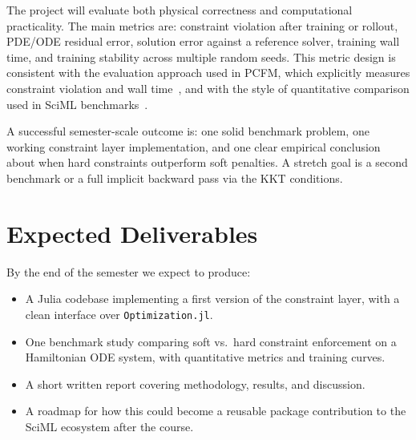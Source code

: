 \documentclass[12pt]{extarticle}
\begin{document}
The project will evaluate both physical correctness and computational
practicality. The main metrics are: constraint violation after training or
rollout, PDE/ODE residual error, solution error against a reference solver,
training wall time, and training stability across multiple random seeds. This
metric design is consistent with the evaluation approach used in PCFM, which
explicitly measures constraint violation and wall time~\cite{utkarsh2025}, and
with the style of quantitative comparison used in SciML
benchmarks~\cite{rackauckas2022}.

A successful semester-scale outcome is: one solid benchmark problem, one
working constraint layer implementation, and one clear empirical conclusion
about when hard constraints outperform soft penalties. A stretch goal is a
second benchmark or a full implicit backward pass via the KKT conditions.

\section*{Expected Deliverables}

By the end of the semester we expect to produce:
\begin{itemize}
  \item A Julia codebase implementing a first version of the constraint layer,
        with a clean interface over \texttt{Optimization.jl}.
  \item One benchmark study comparing soft vs.\ hard constraint enforcement on
        a Hamiltonian ODE system, with quantitative metrics and training curves.
  \item A short written report covering methodology, results, and discussion.
  \item A roadmap for how this could become a reusable package contribution
        to the SciML ecosystem after the course.
\end{itemize}



\end{document}
